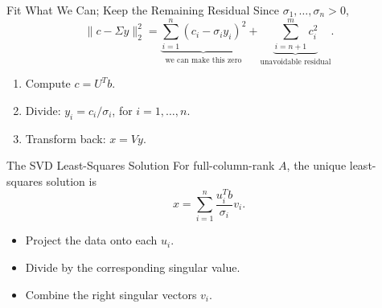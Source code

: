 \documentclass[10pt]{beamer}
\begin{document}
\begin{frame}{Fit What We Can; Keep the Remaining Residual}
Since $\sigma_1,\ldots,\sigma_n>0$,
\[
\|c-\Sigma y\|_2^2
=\underbrace{\sum_{i=1}^n(c_i-\sigma_i y_i)^2}_{\text{we can make this zero}}
+\underbrace{\sum_{i=n+1}^m c_i^2}_{\text{unavoidable residual}}.
\]
\begin{enumerate}
\item Compute $c=U^Tb$.
\item Divide: $y_i=c_i/\sigma_i$, for $i=1,\ldots,n$.
\item Transform back: $x=Vy$.
\end{enumerate}
\end{frame}

\begin{frame}{The SVD Least-Squares Solution}
For full-column-rank $A$, the unique least-squares solution is
\[
\boxed{x=\sum_{i=1}^n\frac{u_i^Tb}{\sigma_i}v_i.}
\]
\begin{itemize}
\item Project the data onto each $u_i$.
\item Divide by the corresponding singular value.
\item Combine the right singular vectors $v_i$.
\end{itemize}
\end{frame}
\end{document}
